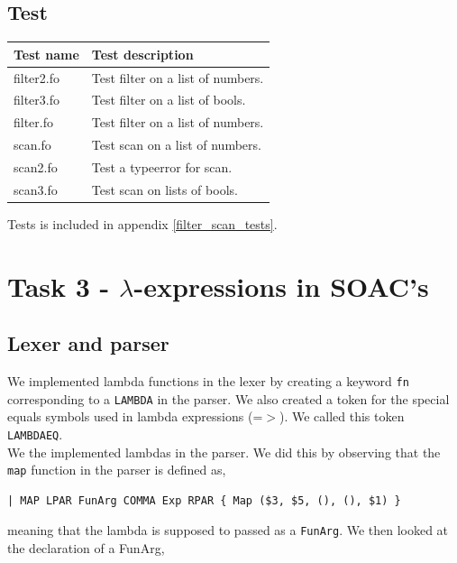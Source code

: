 \documentclass[11pt]{article}
\begin{document}
    \subsection{Test}
    \begin{tabular}{|l|l|}
        \hline
        \textbf{Test name} & \textbf{Test description}                        \\
        \hline
        filter2.fo         & Test filter on a list of numbers.                \\
        \hline
        filter3.fo         & Test filter on a list of bools.                  \\
        \hline
        filter.fo          & Test filter on a list of numbers.                \\
        \hline
        scan.fo            & Test scan on a list of numbers.                  \\
        \hline
        scan2.fo           & Test a typeerror for scan.                       \\
        \hline
        scan3.fo           & Test scan on lists of bools.                     \\
        \hline
    \end{tabular}

    Tests is included in appendix \ref{filter_scan_tests}.

    \section{Task 3 - $\lambda$-expressions in SOAC's}
    \subsection{Lexer and parser}
    We implemented lambda functions in the lexer by creating a keyword
    \texttt{fn} corresponding to a \texttt{LAMBDA} in the parser.  We also
    created a token for the special equals symbols used in lambda expressions
    (=$>$).  We called this token \texttt{LAMBDAEQ}.\\
    We the implemented lambdas
    in the parser.  We did this by observing that the \texttt{map} function in
    the parser is defined as,

    \begin{lstlisting}[basicstyle=\small]
| MAP LPAR FunArg COMMA Exp RPAR { Map ($3, $5, (), (), $1) }
    \end{lstlisting}

    meaning that the lambda is supposed to passed as a \texttt{FunArg}.  We then
    looked at the declaration of a FunArg,
\end{document}
